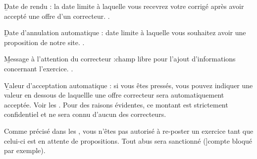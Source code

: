 \item \b{Date de rendu} : la date limite à laquelle vous recevrez votre corrigé après avoir accepté une offre d'un correcteur. .
\item \b{Date d'annulation automatique} : date limite à laquelle vous souhaitez avoir une proposition de notre site. .
\item \b{Message à l'attention du correcteur} :champ libre pour l'ajout d'informations concernant l'exercice. .
\item \b{Valeur d'acceptation automatique} : si vous êtes pressés, vous pouvez indiquer une valeur en dessous de laquellle une offre correcteur sera automatiquement acceptée. Voir les . Pour des raisons évidentes, ce montant est strictement confidentiel et ne sera connu d'aucun des correcteurs.

Comme précisé dans les , vous n'êtes pas autorisé à re-poster un exercice tant que celui-ci est en attente de propositions. Tout abus sera sanctionné (]{compte bloqué} par exemple).